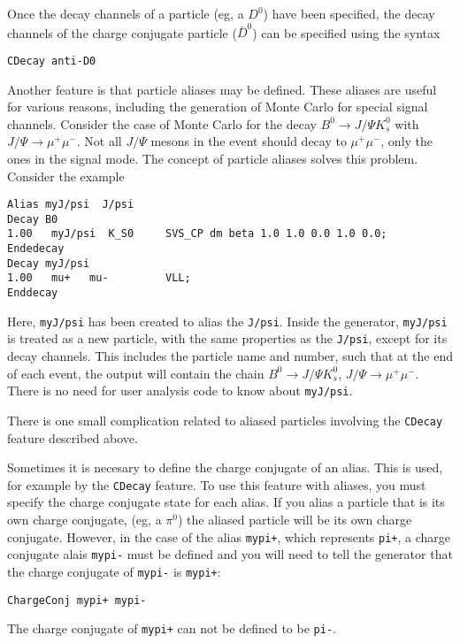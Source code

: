 Once the decay channels of a particle (eg, a $D^0$) have been 
specified, the decay channels of the
charge conjugate particle ($\bar D^0$) can be specified 
using the syntax
\begin{verbatim}
CDecay anti-D0
\end{verbatim}

Another feature is that particle aliases may be defined.
These aliases are useful for various reasons, including the
generation of Monte Carlo for special signal channels. Consider
the case of Monte Carlo for the 
decay $B^0\rightarrow J/\Psi K^0_s$
with $J/\Psi\rightarrow \mu^+\mu^-$.
Not all $J/\Psi$ mesons in the event should decay to $\mu^+\mu^-$, only
the ones in the signal mode. The concept
of particle aliases solves this problem.  Consider the 
example
\begin{verbatim}
Alias myJ/psi  J/psi
Decay B0
1.00   myJ/psi  K_S0     SVS_CP dm beta 1.0 1.0 0.0 1.0 0.0;
Endedecay
Decay myJ/psi
1.00   mu+   mu-         VLL;
Enddecay
\end{verbatim}
Here, {\tt myJ/psi} has been created to alias the {\tt J/psi}. 
Inside the generator, {\tt myJ/psi} is treated as a new particle, 
with the same properties
as the {\tt J/psi}, except for its decay channels.  This includes
the particle name and number, such that at the end of each event,
the output will contain the chain
$B^0\rightarrow J/\Psi K^0_s$, $J/\Psi\rightarrow \mu^+\mu^-$.  There
is no need for user analysis code to know about {\tt myJ/psi}.

There is one small complication related to aliased particles involving
the {\tt CDecay} feature described above.

Sometimes it is necesary to define the charge conjugate of an alias.  This
is used, for example by the {\tt CDecay} feature.  To use this feature 
with aliases, you must specify the charge 
conjugate state for each alias.  If you alias
a particle that is its own charge conjugate, (eg, a $\pi^0$) the aliased
particle will be its own charge conjugate. However, in the case
of the alias {\tt mypi+},  which represents {\tt pi+}, a charge
conjugate alais {\tt mypi-} must be defined and you will need
to tell the generator that the charge conjugate of {\tt mypi-} is
{\tt mypi+}:
\begin{verbatim}
ChargeConj mypi+ mypi-
\end{verbatim}
The charge conjugate of {\tt mypi+} can not be defined to 
be {\tt pi-}.

